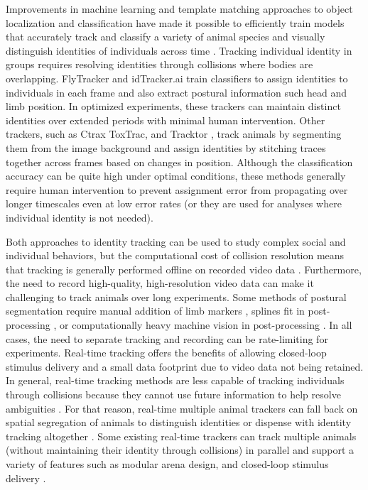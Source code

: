 \documentclass[12pt,letterpaper]{article}
\begin{document}
Improvements in machine learning and template matching approaches to object localization and classification have made it possible to efficiently train models that accurately track and classify a variety of animal species and visually distinguish identities of individuals across time \cite{Eyjolfsdottir_Detecting_2014,Prez-Escudero_idTracker_2014,schneider_2018,romero-ferrero_2019}. Tracking individual identity in groups requires resolving identities through collisions where bodies are overlapping. FlyTracker and idTracker.ai train classifiers to assign identities to individuals in each frame and also extract postural information such head and limb position. In optimized experiments, these trackers can maintain distinct identities over extended periods with minimal human intervention. Other trackers, such as Ctrax ToxTrac, and Tracktor \cite{Branson_High_2009,Rodriguez_ToxId_2017,Sridhar_2019}, track animals by segmenting them from the image background and assign identities by stitching traces together across frames based on changes in position. Although the classification accuracy can be quite high under optimal conditions, these methods generally require human intervention to prevent assignment error from propagating over longer timescales even at low error rates (or they are used for analyses where individual identity is not needed). 

Both approaches to identity tracking can be used to study complex social and individual behaviors, but the computational cost of collision resolution means that tracking is generally performed offline on recorded video data \cite{Liu_A_2018}. Furthermore, the need to record high-quality, high-resolution video data can make it challenging to track animals over long experiments. Some methods of postural segmentation require manual addition of limb markers \cite{Kain_Leg_2013}, splines fit in post-processing \cite{Uhlmann_FlyLimbTracker_2017}, or computationally heavy machine vision in post-processing \cite{Mathis_DeepLabCut_2018,Pereira_Fast_2018,romero-ferrero_2019}. In all cases, the need to separate tracking and recording can be rate-limiting for experiments. Real-time tracking offers the benefits of allowing closed-loop stimulus delivery and a small data footprint due to video data not being retained. In general, real-time tracking methods are less capable of tracking individuals through collisions because they cannot use future information to help resolve ambiguities \cite{Itskovits_A_2017}. For that reason, real-time multiple animal trackers can fall back on spatial segregation of animals to distinguish identities or dispense with identity tracking altogether \cite{Liu_A_2018,Scaplen_Automated_2019}. Some existing real-time trackers can track multiple animals (without maintaining their identity through collisions) in parallel and support a variety of features such as modular arena design, and closed-loop stimulus delivery \cite{Geissmann_Ethoscopes_2017,Straw_Multi_2010,Stowers_Virtual_2017,Chagas_The_2017}.
\end{document}
